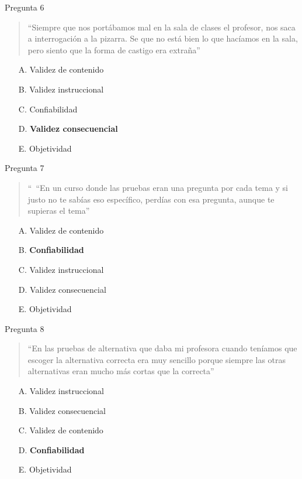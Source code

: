 \documentclass[11pt, aspectratio=169, xcolor=table,hyphens]{beamer}
\begin{document}
\begin{frame}{Pregunta 6}
	\begin{quote}
		``Siempre que nos portábamos mal en la sala de clases el profesor, nos saca a interrogación a la pizarra. Se que no está bien lo que hacíamos en la sala, pero siento que la forma de castigo era extraña''
	\end{quote}
	\begin{enumerate}
		\item[A.] Validez de contenido
		\item[B.] Validez instruccional
		\item[C.] Confiabilidad
		\item[D.] \textbf<2->{Validez consecuencial}
		\item[E.] Objetividad
	\end{enumerate}
\end{frame}

\begin{frame}{Pregunta 7}
	\begin{quote}
		`` “En un curso donde las pruebas eran una pregunta por cada tema y si justo no te sabías eso específico, perdías con esa pregunta, aunque te supieras el tema''
	\end{quote}
	\begin{enumerate}
		\item[A.] Validez de contenido
		\item[B.] \textbf<2->{Confiabilidad}
		\item[C.] Validez instruccional
		\item[D.] Validez consecuencial
		\item[E.] Objetividad
	\end{enumerate}
\end{frame}

\begin{frame}{Pregunta 8}
	\begin{quote}
		``En las pruebas de alternativa que daba mi profesora cuando teníamos que escoger la alternativa correcta era muy sencillo porque siempre las otras alternativas eran mucho más cortas que la correcta''
	\end{quote}
	\begin{enumerate}
		\item[A.] Validez instruccional
		\item[B.] Validez consecuencial
		\item[C.] Validez de contenido
		\item[D.] \textbf<2->{Confiabilidad}
		\item[E.] Objetividad
	\end{enumerate}
\end{frame}
\end{document}
